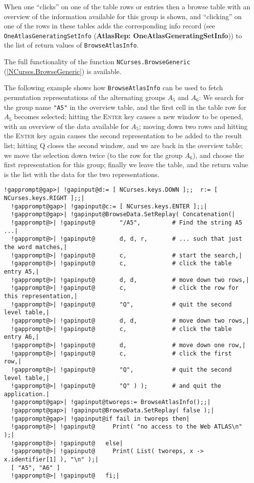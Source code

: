 \documentclass[a4paper,11pt]{report}
\begin{document}
{{{ When one ``clicks'' on one of the table rows or entries then a browse table with an overview of
the information available for this group is shown, and ``clicking'' on one of the rows in these tables adds the corresponding info record (see \texttt{OneAtlasGeneratingSetInfo} (\textbf{AtlasRep: OneAtlasGeneratingSetInfo})) to the list of return values of \texttt{BrowseAtlasInfo}. 

 The full functionality of the function \texttt{NCurses.BrowseGeneric} (\ref{NCurses.BrowseGeneric}) is available. 

 The following example shows how \texttt{BrowseAtlasInfo} can be used to fetch permutation representations of the alternating groups $A_5$ and $A_6$: We search for the group name \texttt{"A5"} in the overview table, and the first cell in the table row for $A_5$ becomes selected; hitting the \textsc{Enter} key causes a new window to be opened, with an overview of the data available
for $A_5$; moving down two rows and hitting the \textsc{Enter} key again causes the second representation to be added to the result list;
hitting \textsc{Q} closes the second window, and we are back in the overview table; we move the
selection down twice (to the row for the group $A_6$), and choose the first representation for this group; finally we leave the
table, and the return value is the list with the data for the two
representations. 

 
\begin{Verbatim}[commandchars=!@|,fontsize=\small,frame=single,label=Example]
  !gapprompt@gap>| !gapinput@d:= [ NCurses.keys.DOWN ];;  r:= [ NCurses.keys.RIGHT ];;|
  !gapprompt@gap>| !gapinput@c:= [ NCurses.keys.ENTER ];;|
  !gapprompt@gap>| !gapinput@BrowseData.SetReplay( Concatenation(|
  !gapprompt@>| !gapinput@       "/A5",         # Find the string A5 ...|
  !gapprompt@>| !gapinput@       d, d, r,       # ... such that just the word matches,|
  !gapprompt@>| !gapinput@       c,             # start the search,|
  !gapprompt@>| !gapinput@       c,             # click the table entry A5,|
  !gapprompt@>| !gapinput@       d, d,          # move down two rows,|
  !gapprompt@>| !gapinput@       c,             # click the row for this representation,|
  !gapprompt@>| !gapinput@       "Q",           # quit the second level table,|
  !gapprompt@>| !gapinput@       d, d,          # move down two rows,|
  !gapprompt@>| !gapinput@       c,             # click the table entry A6,|
  !gapprompt@>| !gapinput@       d,             # move down one row,|
  !gapprompt@>| !gapinput@       c,             # click the first row,|
  !gapprompt@>| !gapinput@       "Q",           # quit the second level table,|
  !gapprompt@>| !gapinput@       "Q" ) );       # and quit the application.|
  !gapprompt@gap>| !gapinput@tworeps:= BrowseAtlasInfo();;|
  !gapprompt@gap>| !gapinput@BrowseData.SetReplay( false );|
  !gapprompt@gap>| !gapinput@if fail in tworeps then|
  !gapprompt@>| !gapinput@     Print( "no access to the Web ATLAS\n" );|
  !gapprompt@>| !gapinput@   else|
  !gapprompt@>| !gapinput@     Print( List( tworeps, x -> x.identifier[1] ), "\n" );|
  [ "A5", "A6" ]
  !gapprompt@>| !gapinput@   fi;|
\end{Verbatim}
 

}}}
\end{document}
